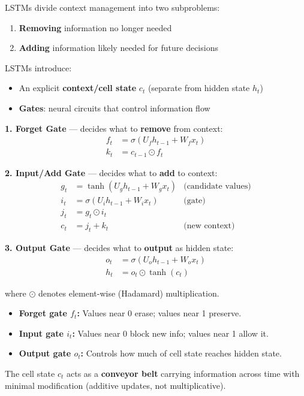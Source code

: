 \begin{defbox}
LSTMs divide context management into two subproblems:
\begin{enumerate}
  \item \textbf{Removing} information no longer needed
  \item \textbf{Adding} information likely needed for future decisions
\end{enumerate}

LSTMs introduce:
\begin{itemize}
  \item An explicit \textbf{context/cell state} $c_t$ (separate from hidden state $h_t$)
  \item \textbf{Gates}: neural circuits that control information flow
\end{itemize}
\end{defbox}

\begin{defbox}
\textbf{1. Forget Gate} --- decides what to \textbf{remove} from context:
\begin{align*}
f_t &= \sigma(U_f h_{t-1} + W_f x_t) \\
k_t &= c_{t-1} \odot f_t
\end{align*}

\textbf{2. Input/Add Gate} --- decides what to \textbf{add} to context:
\begin{align*}
g_t &= \tanh(U_g h_{t-1} + W_g x_t) & \text{(candidate values)} \\
i_t &= \sigma(U_i h_{t-1} + W_i x_t) & \text{(gate)} \\
j_t &= g_t \odot i_t \\
c_t &= j_t + k_t & \text{(new context)}
\end{align*}

\textbf{3. Output Gate} --- decides what to \textbf{output} as hidden state:
\begin{align*}
o_t &= \sigma(U_o h_{t-1} + W_o x_t) \\
h_t &= o_t \odot \tanh(c_t)
\end{align*}

where $\odot$ denotes element-wise (Hadamard) multiplication.
\end{defbox}

\begin{tipbox}
\begin{itemize}
  \item \textbf{Forget gate $f_t$:} Values near 0 erase; values near 1 preserve.
  \item \textbf{Input gate $i_t$:} Values near 0 block new info; values near 1 allow it.
  \item \textbf{Output gate $o_t$:} Controls how much of cell state reaches hidden state.
\end{itemize}

The cell state $c_t$ acts as a \textbf{conveyor belt} carrying information across time with minimal modification (additive updates, not multiplicative).
\end{tipbox}

